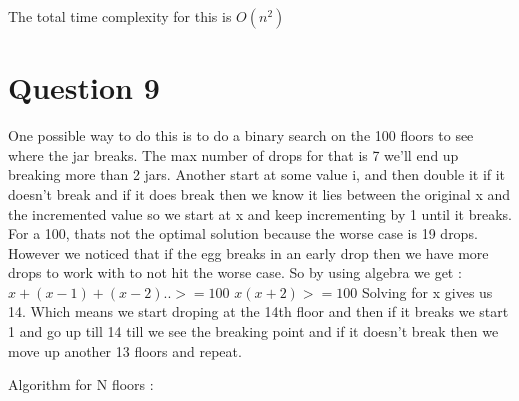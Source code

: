 \documentclass{article}
\begin{document}
    

    The total time complexity for this is $O(n^2)$

\section{Question 9}

    One possible way to do this is to do a binary search on the 100 floors to see where the jar breaks. The max number of drops for that is 7 we'll end up breaking more than 2 jars.
    Another start at some value i, and then double it if it doesn't break and if it does break then we know it lies between the original x and the incremented value so we start at x and keep incrementing by 1 until it breaks.
    For a 100, thats not the optimal solution because the worse case is 19 drops. However we noticed that if the egg breaks in an early drop then we have more drops to work with to not hit the worse case. So by using algebra we get :
    $x + (x-1) + (x-2) .. >= 100$
    $x(x+2) >= 100$
    Solving for x gives us 14.
    Which means we start droping at the 14th floor and then if it breaks we start 1 and go up till 14 till we see the breaking point and if it doesn't break then we move up another 13 floors and repeat.

    Algorithm for N floors :
    
\end{document}
